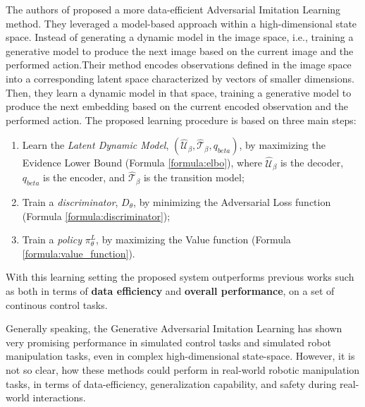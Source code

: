The authors of \cite{rafailov2021visual_ail} proposed a more data-efficient Adversarial Imitation Learning method. They leveraged a model-based approach within a high-dimensional state space. Instead of generating a dynamic model in the image space, i.e., training a generative model to produce the next image based on the current image and the performed action.Their method encodes observations defined in the image space into a corresponding latent space characterized by vectors of smaller dimensions. Then, they learn a dynamic model in that space, training a generative model to produce the next embedding based on the current encoded observation and the performed action. The proposed learning procedure is based on three main steps:
\begin{enumerate}[label=\arabic*.]
    \item Learn the \textit{Latent Dynamic Model}, $(\hat{\mathcal{U}}_{\beta},\hat{\mathcal{T}}_{\beta}, q_{beta})$, by maximizing the Evidence Lower Bound (Formula \ref{formula:elbo}), where $\hat{\mathcal{U}}_{\beta}$ is the decoder, $q_{beta}$ is the encoder, and $\hat{\mathcal{T}}_{\beta}$ is the transition model;
    \item Train a \textit{discriminator}, $D_{\theta}$, by minimizing the Adversarial Loss function (Formula \ref{formula:discriminator});
    \item Train a \textit{policy} $\pi^{L}_{\theta}$, by maximizing the Value function (Formula \ref{formula:value_function}).
\end{enumerate}

With this learning setting the proposed system outperforms previous works such as \cite{reddy2019sqil,kostrikov2018discriminator} both in terms of \textbf{data efficiency} and \textbf{overall performance}, on a set of continous control tasks.
% 

Generally speaking, the Generative Adversarial Imitation Learning has shown very promising performance in simulated control tasks and simulated robot manipulation tasks, even in complex high-dimensional state-space. However, it is not so clear, how these methods could perform in real-world robotic manipulation tasks, in terms of data-efficiency, generalization capability, and safety during real-world interactions. 